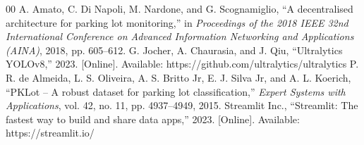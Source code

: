 \documentclass[conference]{IEEEtran}
\begin{document}
\begin{thebibliography}{00}
 A. Amato, C. Di Napoli, M. Nardone, and G. Scognamiglio, ``A decentralised architecture for parking lot monitoring,'' in \textit{Proceedings of the 2018 IEEE 32nd International Conference on Advanced Information Networking and Applications (AINA)}, 2018, pp. 605--612.
 G. Jocher, A. Chaurasia, and J. Qiu, ``Ultralytics YOLOv8,'' 2023. [Online]. Available: https://github.com/ultralytics/ultralytics
 P. R. de Almeida, L. S. Oliveira, A. S. Britto Jr, E. J. Silva Jr, and A. L. Koerich, ``PKLot – A robust dataset for parking lot classification,'' \textit{Expert Systems with Applications}, vol. 42, no. 11, pp. 4937--4949, 2015.
 Streamlit Inc., ``Streamlit: The fastest way to build and share data apps,'' 2023. [Online]. Available: https://streamlit.io/
\end{thebibliography}
\end{document}
